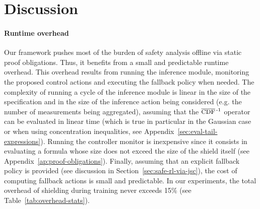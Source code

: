 \documentclass[acmsmall,screen,nonacm]{acmart}
\begin{document}
\section{Discussion}\label{sec:discussion}

\paragraph{Runtime overhead} Our framework pushes most of the burden of safety analysis offline via static proof obligations. Thus, it benefits from a small and predictable runtime overhead. This overhead results from running the inference module, monitoring the proposed control actions and executing the fallback policy when needed. The complexity of running a cycle of the inference module is linear in the size of the specification and in the size of the inference action being considered (e.g. the number of measurements being aggregated), assuming that the $\InvCCDF$ operator can be evaluated in linear time (which is true in particular in the Gaussian case or when using concentration inequalities, see Appendix~\ref{sec:eval-tail-expressions}). Running the controller monitor is inexpensive since it consists in evaluating a formula whose size does not exceed the size of the shield itself (see Appendix~\ref{ap:proof-obligations}). Finally, assuming that an explicit fallback policy is provided (see discussion in Section~\ref{sec:safe-rl-via-jsc}), the cost of computing fallback actions is small and predictable. In our experiments, the total overhead of shielding during training never exceeds 15\% (see Table~\ref{tab:overhead-stats}).
\end{document}
